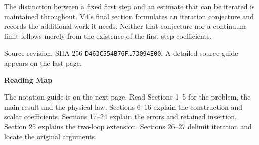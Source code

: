 \documentclass[11pt,a4paper]{article}
\begin{document}
The distinction between a fixed first step and an estimate that can be iterated is maintained throughout. V4's final section formulates an iteration conjecture and records the additional work it needs. Neither that conjecture nor a continuum limit follows merely from the existence of the first-step coefficients.

\vfill
{\small\color{muted}Source revision: SHA-256 \texttt{D463C554B76F\ldots 73094E00}.\quad
    A detailed source guide appears on the last page.\par}

\clearpage
\thispagestyle{fancy}
{\LARGE\bfseries\color{ink}Reading Map\par}
\vspace{9pt}
The notation guide is on the next page. Read Sections 1--5 for the problem, the main result and the physical law. Sections 6--16 explain the construction and scalar coefficients. Sections 17--24 explain the errors and retained insertion. Section 25 explains the two-loop extension. Sections 26--27 delimit iteration and locate the original arguments.
\end{document}
